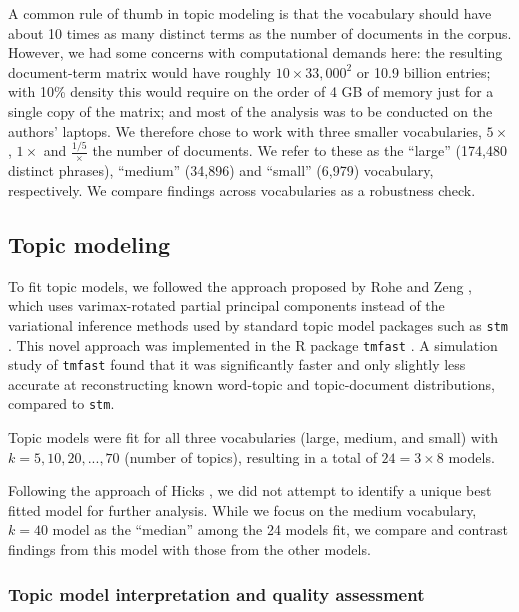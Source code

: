\documentclass[12pt]{article}
\begin{document}
A common rule of thumb in topic modeling is that the vocabulary should have about 10 times as many distinct terms as the number of documents in the corpus. However, we had some concerns with computational demands here: the resulting document-term matrix would have roughly \(10 \times 33,000^2\) or 10.9 billion entries; with 10\% density this would require on the order of 4 GB of memory just for a single copy of the matrix; and most of the analysis was to be conducted on the authors' laptops. We therefore chose to work with three smaller vocabularies, \(5 \times\), \(1 \times\) and \(\frac{1/5} \times\) the number of documents. We refer to these as the ``large'' (174,480 distinct phrases), ``medium'' (34,896) and ``small'' (6,979) vocabulary, respectively. We compare findings across vocabularies as a robustness check.

\hypertarget{topic-modeling}{%
\subsection{Topic modeling}\label{topic-modeling}}

To fit topic models, we followed the approach proposed by Rohe and Zeng \cite{RoheVintageFactorAnalysis2020}, which uses varimax-rotated partial principal components instead of the variational inference methods used by standard topic model packages such as \texttt{stm} \cite{RobertsStmPackageStructural2019}. This novel approach was implemented in the R package \texttt{tmfast} \cite{HicksTmfastFitsTopic2023}. A simulation study of \texttt{tmfast} found that it was significantly faster and only slightly less accurate at reconstructing known word-topic and topic-document distributions, compared to \texttt{stm}.

Topic models were fit for all three vocabularies (large, medium, and small) with \(k = 5, 10, 20, ..., 70\) (number of topics), resulting in a total of \(24 = 3 \times 8\) models.

Following the approach of Hicks \cite{HicksProductivityInterdisciplinaryImpacts2021}, we did not attempt to identify a unique best fitted model for further analysis. While we focus on the medium vocabulary, \(k=40\) model as the ``median'' among the 24 models fit, we compare and contrast findings from this model with those from the other models.

\hypertarget{topic-model-interpretation-and-quality-assessment}{%
\subsubsection{Topic model interpretation and quality assessment}\label{topic-model-interpretation-and-quality-assessment}}
\end{document}
